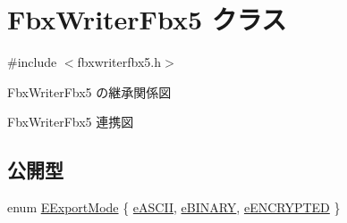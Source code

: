 \hypertarget{class_fbx_writer_fbx5}{}\section{Fbx\+Writer\+Fbx5 クラス}
\label{class_fbx_writer_fbx5}


{\ttfamily \#include $<$fbxwriterfbx5.\+h$>$}



Fbx\+Writer\+Fbx5 の継承関係図


Fbx\+Writer\+Fbx5 連携図
\subsection*{公開型}
\begin{DoxyCompactItemize}
\item 
enum \hyperlink{class_fbx_writer_fbx5_a0424a2f24c66021ce1bfe4477eb4209e}{E\+Export\+Mode} \{ \hyperlink{class_fbx_writer_fbx5_a0424a2f24c66021ce1bfe4477eb4209ea621f1d3ad7d63e3eb7c8be9b5e7f072e}{e\+A\+S\+C\+II}, 
\hyperlink{class_fbx_writer_fbx5_a0424a2f24c66021ce1bfe4477eb4209eabf07ca4fdfacef5a90a50627c9a2a914}{e\+B\+I\+N\+A\+RY}, 
\hyperlink{class_fbx_writer_fbx5_a0424a2f24c66021ce1bfe4477eb4209ea5530b888a8d36848ea14f4392340b2bf}{e\+E\+N\+C\+R\+Y\+P\+T\+ED}
 \}
\end{DoxyCompactItemize}
